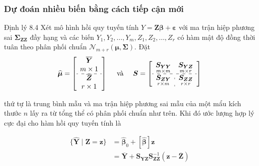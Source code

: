 \begin{frame}
    \frametitle{Dự đoán nhiều biến bằng cách tiếp cận mới}
    \begin{block}{Định lý 8.4}
        Xét mô hình hồi quy tuyến tính \( Y = \boldsymbol{Z} \boldsymbol{\beta} + \boldsymbol{\varepsilon} \) với ma trận hiệp phương sai \(\boldsymbol{\Sigma}_{\boldsymbol{Z} \boldsymbol{Z}}\) đầy hạng và các biến \( Y_1, Y_2, \ldots, Y_m, Z_1, Z_2, \ldots, Z_r \) có hàm mật độ đồng thời tuân theo phân phối chuẩn \(\mathcal{N}_{m+r}(\boldsymbol{\mu}, \boldsymbol{\Sigma})\).
        Đặt
        \[
\widehat{\boldsymbol{\mu}}=\left[\begin{array}{c}
\overline{\boldsymbol{Y}} \\
m \times 1 \\
\hdashline \overline{\boldsymbol{Z}} \\
r \times 1
\end{array}\right] \quad \text { và } \quad \boldsymbol{S}=\left[\begin{array}{c:c}
\underset{m \times m}{\boldsymbol{S}_{\boldsymbol{Y} \boldsymbol{Y}}} & \underset{m \times r}{\boldsymbol{S}_{\boldsymbol{Y Z}}} \\
\hdashline \underset{r \times m}{\boldsymbol{S}_{\boldsymbol{Z} \boldsymbol{Y}}} & \underset{r \times r}{\boldsymbol{S}_{\boldsymbol{Z Z}}}
\end{array}\right]
        \]

        thứ tự là trung bình mẫu và ma trận hiệp phương sai mẫu của một mẩu kích thước \( n \) lấy ra từ tổng thể có phân phối chuẩn như trên.
        Khi đó ước lượng hợp lý cực đại cho hàm hồi quy tuyến tính là

        \begin{align*}
            \{\widehat{\boldsymbol{Y}} \mid \boldsymbol{Z} = \boldsymbol{z}\} &= \widehat{\boldsymbol{\beta}}_0 + [\widehat{\boldsymbol{\beta}}] \boldsymbol{z} \\
            &= \overline{\boldsymbol{Y}} + \boldsymbol{S}_{\boldsymbol{Y} \boldsymbol{Z}} \boldsymbol{S}_{\boldsymbol{Z} \boldsymbol{Z}}^{-1} (\boldsymbol{z} - \overline{\boldsymbol{Z}})
        \end{align*}
    \end{block}

\end{frame}

